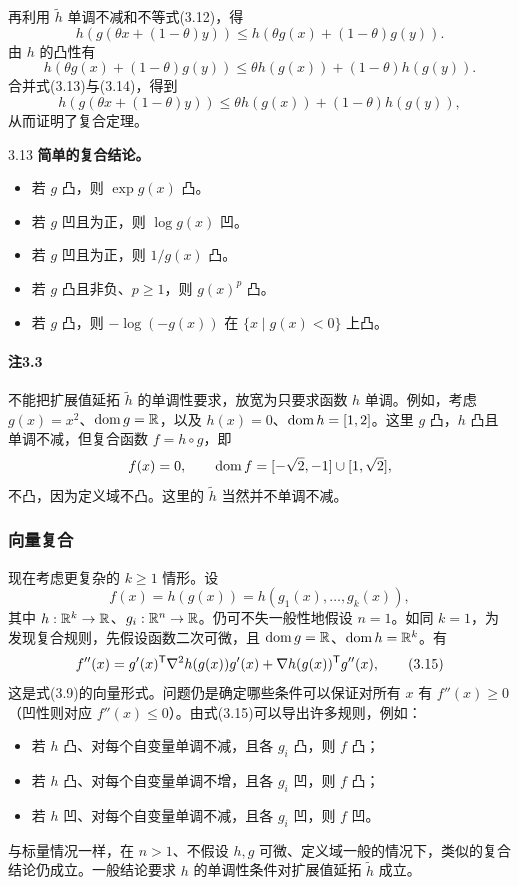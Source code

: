 再利用 $\widetilde h$ 单调不减和不等式(3.12)，得
\begin{equation}h(g(\theta x+(1-\theta)y))\leq h(\theta g(x)+(1-\theta)g(y)).\tag{3.13}\end{equation}
由 $h$ 的凸性有
\begin{equation}h(\theta g(x)+(1-\theta)g(y))\leq\theta h(g(x))+(1-\theta)h(g(y)).\tag{3.14}\end{equation}
合并式(3.13)与(3.14)，得到
\[h(g(\theta x+(1-\theta)y))\leq\theta h(g(x))+(1-\theta)h(g(y)),\]
从而证明了复合定理。
\begin{origexample}{3.13}
\textbf{简单的复合结论。}
\begin{itemize}
\item 若 $g$ 凸，则 $\exp g(x)$ 凸。
\item 若 $g$ 凹且为正，则 $\log g(x)$ 凹。
\item 若 $g$ 凹且为正，则 $1/g(x)$ 凸。
\item 若 $g$ 凸且非负、$p\geq1$，则 $g(x)^p$ 凸。
\item 若 $g$ 凸，则 $-\log(-g(x))$ 在 $\{x\mid g(x)<0\}$ 上凸。
\end{itemize}
\end{origexample}
\paragraph{注3.3}不能把扩展值延拓 $\widetilde h$ 的单调性要求，放宽为只要求函数 $h$ 单调。例如，考虑 $g(x)=x^2$、$\operatorname{dom} g=\mathbb R$，以及 $h(x)=0$、$\operatorname{dom} h=[1,2]$。这里 $g$ 凸，$h$ 凸且单调不减，但复合函数 $f=h\circ g$，即
\[f(x)=0,\qquad\operatorname{dom} f=[-\sqrt2,-1]\cup[1,\sqrt2],\]
不凸，因为定义域不凸。这里的 $\widetilde h$ 当然并不单调不减。

\subsubsection*{向量复合}
现在考虑更复杂的 $k\geq1$ 情形。设
\[f(x)=h(g(x))=h(g_1(x),\ldots,g_k(x)),\]
其中 $h:\mathbb R^k\to\mathbb R$、$g_i:\mathbb R^n\to\mathbb R$。仍可不失一般性地假设 $n=1$。如同 $k=1$，为发现复合规则，先假设函数二次可微，且 $\operatorname{dom} g=\mathbb R$、$\operatorname{dom} h=\mathbb R^k$。有
\begin{equation}
 f''(x)=g'(x)^\mathsf T\nabla^2h(g(x))g'(x)+\nabla h(g(x))^\mathsf T g''(x),\tag{3.15}
\end{equation}
这是式(3.9)的向量形式。问题仍是确定哪些条件可以保证对所有 $x$ 有 $f''(x)\geq0$（凹性则对应 $f''(x)\leq0$）。由式(3.15)可以导出许多规则，例如：
\begin{itemize}
\item 若 $h$ 凸、对每个自变量单调不减，且各 $g_i$ 凸，则 $f$ 凸；
\item 若 $h$ 凸、对每个自变量单调不增，且各 $g_i$ 凹，则 $f$ 凸；
\item 若 $h$ 凹、对每个自变量单调不减，且各 $g_i$ 凹，则 $f$ 凹。
\end{itemize}
与标量情况一样，在 $n>1$、不假设 $h,g$ 可微、定义域一般的情况下，类似的复合结论仍成立。一般结论要求 $h$ 的单调性条件对扩展值延拓 $\widetilde h$ 成立。

